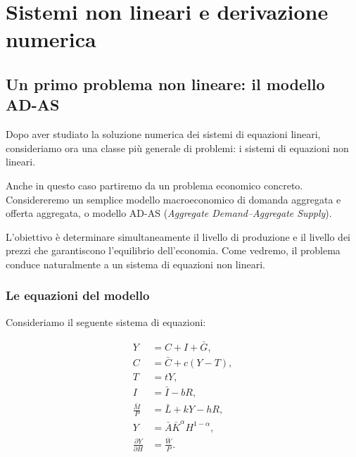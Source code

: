 
\chapter{Sistemi non lineari e derivazione numerica}
\newpage
\minitoc
\newpage

\section{Un primo problema non lineare: il modello AD-AS}
\label{sec:modello-adas}

Dopo aver studiato la soluzione numerica dei sistemi di equazioni
lineari, consideriamo ora una classe più generale di problemi:
i sistemi di equazioni non lineari.

Anche in questo caso partiremo da un problema economico concreto.
Considereremo un semplice modello macroeconomico di domanda aggregata
e offerta aggregata, o modello AD-AS (\emph{Aggregate Demand--Aggregate
Supply}).

L'obiettivo è determinare simultaneamente il livello di produzione e
il livello dei prezzi che garantiscono l'equilibrio dell'economia.
Come vedremo, il problema conduce naturalmente a un sistema di
equazioni non lineari.


\subsection{Le equazioni del modello}

Consideriamo il seguente sistema di equazioni:

\begin{align*}
Y &= C+I+\bar{G},\\%
C &= \bar{C}+c(Y-T),\\%
T &= tY,\\%
I &= \bar{I}-bR,\\%
\frac{\bar{M}}{P} &= \bar{L}+kY-hR,\\%
Y &= \bar{A}\bar{K}^{\alpha}H^{1-\alpha},\\%
\frac{\partial Y}{\partial H} &= \frac{\bar{W}}{P}.
\end{align*}

